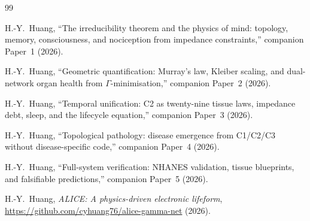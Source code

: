 \documentclass[aps,pre,twocolumn,superscriptaddress,floatfix]{revtex4-2}
\begin{document}
\begin{thebibliography}{99}

H.-Y.~Huang,
``The irreducibility theorem and the physics of mind:
topology, memory, consciousness, and nociception
from impedance constraints,''
companion Paper~1 (2026).

H.-Y.~Huang,
``Geometric quantification: Murray's law, Kleiber scaling,
and dual-network organ health from $\Gamma$-minimisation,''
companion Paper~2 (2026).

H.-Y.~Huang,
``Temporal unification: C2 as twenty-nine tissue laws,
impedance debt, sleep, and the lifecycle equation,''
companion Paper~3 (2026).

H.-Y.~Huang,
``Topological pathology: disease emergence from
C1/C2/C3 without disease-specific code,''
companion Paper~4 (2026).

H.-Y.~Huang,
``Full-system verification: NHANES validation,
tissue blueprints, and falsifiable predictions,''
companion Paper~5 (2026).

H.-Y.~Huang,
\emph{ALICE: A physics-driven electronic lifeform},
\url{https://github.com/cyhuang76/alice-gamma-net} (2026).

\end{thebibliography}
\end{document}

